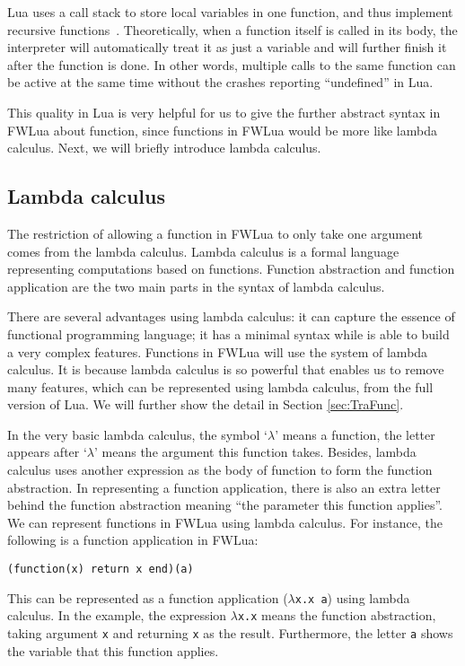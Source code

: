 Lua uses a call stack to store local variables in one function, and thus implement recursive functions~\cite{begLua}. Theoretically, when a function itself is called in its body, the interpreter will automatically treat it as just a variable and will further finish it after the function is done. In other words, multiple calls to the same function can be active at the same time without the crashes reporting ``undefined'' in Lua.

This quality in Lua is very helpful for us to give the further abstract syntax in FWLua about function, since functions in FWLua would be more like lambda calculus. Next, we will briefly introduce lambda calculus.

\subsection{Lambda calculus}
The restriction of allowing a function in FWLua to only take one argument comes from the lambda calculus. Lambda calculus is a formal language representing computations based on functions. Function abstraction and function application are the two main parts in the syntax of lambda calculus. 

There are several advantages using lambda calculus: it can capture the essence of functional programming language; it has a minimal syntax while is able to build a very complex features. Functions in FWLua will use the system of lambda calculus. It is because lambda calculus is so powerful that enables us to remove many features, which can be represented using lambda calculus, from the full version of Lua. We will further show the detail in Section \ref{sec:TraFunc}.

In the very basic lambda calculus, the symbol `$\lambda$' means a function, the letter appears after `$\lambda$' means the argument this function takes.
Besides, lambda calculus uses another expression as the body of function to form the function abstraction. In representing a function application, there is also an extra letter behind the function abstraction meaning ``the parameter this function applies''. We can represent functions in FWLua using lambda calculus. For instance, the following is a function application in FWLua:

\begin{verbatim}
(function(x) return x end)(a)
\end{verbatim}

This can be represented as a function application ({\tt $\lambda$x.x a}) using lambda calculus. In the example, the expression {\tt $\lambda$x.x} means the function abstraction, taking argument {\tt x} and returning {\tt x} as the result. Furthermore, the letter {\tt a} shows the variable that this function applies.


